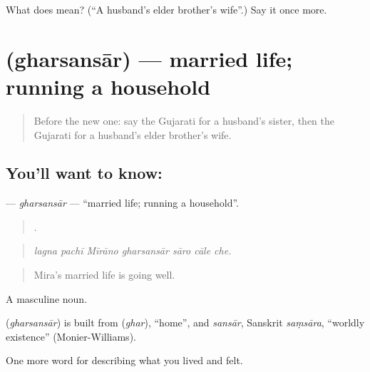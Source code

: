 \begin{tcolorbox}[breakable,colback=teal!4,colframe=teal!35!black,title={Before you move on}]
What does  mean? (\textquotedblleft{}A husband's elder brother's wife\textquotedblright{}.) Say it once more.
\end{tcolorbox}
\section[\texorpdfstring{\gu{ઘરસંસાર} (gharsansār)}{ઘરસંસાર (gharsansār)}]{ (gharsansār) — married life; running a household}

\label{lesson:GU-C490-gharsansar}



\begin{quote}
Before the new one: say the Gujarati for a husband's sister, then the Gujarati for a husband's elder brother's wife.
\end{quote}

\subsection*{You'll want to know: }
\textbf{} — \emph{gharsansār} — \textquotedblleft{}married life; running a household\textquotedblright{}.

\begin{quote}
      .
\end{quote}

\begin{quote}
\emph{lagna pachī Mīrāno gharsansār sāro cāle che.}
\end{quote}

\begin{quote}
Mira's married life is going well.
\end{quote}

A masculine noun.

\begin{cousinweb}
\textbf{} (\emph{gharsansār}) is built from \textbf{} (\emph{ghar}), \textquotedblleft{}home\textquotedblright{}, and \emph{sansār}, Sanskrit \emph{saṃsāra}, \textquotedblleft{}worldly existence\textquotedblright{} (Monier-Williams).
\end{cousinweb}

\begin{grammarlens}[title={What you've built}]
One more word for describing what you lived and felt.
\end{grammarlens}

